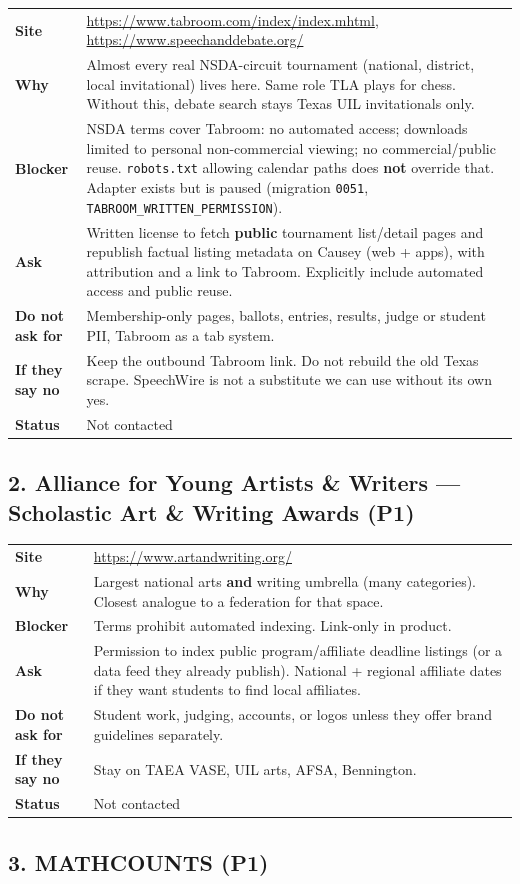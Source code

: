 \documentclass[11pt]{article}
\newcommand{\orgrow}[2]{%
  \textbf{#1} & #2 \\[0.35em]
}
\begin{document}
\begin{tabularx}{\textwidth}{@{}L{2.55cm} Y@{}}
\orgrow{Site}{\url{https://www.tabroom.com/index/index.mhtml}, \url{https://www.speechanddebate.org/}}
\orgrow{Why}{Almost every real NSDA-circuit tournament (national, district, local invitational) lives here. Same role TLA plays for chess. Without this, debate search stays Texas UIL invitationals only.}
\orgrow{Blocker}{NSDA terms cover Tabroom: no automated access; downloads limited to personal non-commercial viewing; no commercial/public reuse. \texttt{robots.txt} allowing calendar paths does \textbf{not} override that. Adapter exists but is paused (migration \texttt{0051}, \texttt{TABROOM\_WRITTEN\_PERMISSION}).}
\orgrow{Ask}{Written license to fetch \textbf{public} tournament list/detail pages and republish factual listing metadata on Causey (web + apps), with attribution and a link to Tabroom. Explicitly include automated access and public reuse.}
\orgrow{Do not ask for}{Membership-only pages, ballots, entries, results, judge or student PII, Tabroom as a tab system.}
\orgrow{If they say no}{Keep the outbound Tabroom link. Do not rebuild the old Texas scrape. SpeechWire is not a substitute we can use without its own yes.}
\orgrow{Status}{Not contacted}
\end{tabularx}

\subsection*{2. Alliance for Young Artists \& Writers --- Scholastic Art \& Writing Awards (P1)}

\begin{tabularx}{\textwidth}{@{}L{2.55cm} Y@{}}
\orgrow{Site}{\url{https://www.artandwriting.org/}}
\orgrow{Why}{Largest national arts \textbf{and} writing umbrella (many categories). Closest analogue to a federation for that space.}
\orgrow{Blocker}{Terms prohibit automated indexing. Link-only in product.}
\orgrow{Ask}{Permission to index public program/affiliate deadline listings (or a data feed they already publish). National + regional affiliate dates if they want students to find local affiliates.}
\orgrow{Do not ask for}{Student work, judging, accounts, or logos unless they offer brand guidelines separately.}
\orgrow{If they say no}{Stay on TAEA VASE, UIL arts, AFSA, Bennington.}
\orgrow{Status}{Not contacted}
\end{tabularx}

\subsection*{3. MATHCOUNTS (P1)}
\end{document}

